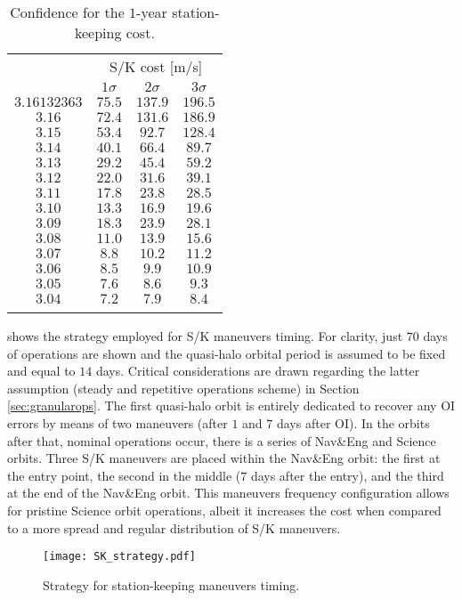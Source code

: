%
\begin{table}[]
	\caption{Confidence for the $1$-year station-keeping cost.}
	\label{tab:SKconfidence}
	\centering
	\begin{tabular}{cccc}
		\TOPlines
		\multirow{2}{*}{$C_j$ [adim]} & \multicolumn{3}{c}{S/K cost [m/s]} \\
		& $1\sigma$ & $2\sigma$ & $3\sigma$ \\
		\MIDline
		$3.16132363$ & $75.5$ & $137.9$ & $196.5$ \\
		$3.16$ & $72.4$ & $131.6$ & $186.9$ \\
		$3.15$ & $53.4$ & $92.7$ & $128.4$ \\
		$3.14$ & $40.1$ & $66.4$ & $89.7$ \\
		$3.13$ & $29.2$ & $45.4$ & $59.2$ \\
		$3.12$ & $22.0$ & $31.6$ & $39.1$ \\
		$3.11$ & $17.8$ & $23.8$ & $28.5$ \\
		$3.10$ & $13.3$ & $16.9$ & $19.6$ \\
		$3.09$ & $18.3$ & $23.9$ & $28.1$ \\
		$3.08$ & $11.0$ & $13.9$ & $15.6$ \\
		$3.07$ & $8.8$ & $10.2$ & $11.2$ \\
		$3.06$ & $8.5$ & $9.9$ & $10.9$ \\
		$3.05$ & $7.6$ & $8.6$ & $9.3$ \\
		$3.04$ & $7.2$ & $7.9$ & $8.4$ \\
		\BOTTOMlines
	\end{tabular}
\end{table}
%
 shows the strategy employed for S/K maneuvers timing. For clarity, just $70$ days of operations are shown and the quasi-halo orbital period is assumed to be fixed and equal to $14$ days. Critical considerations are drawn regarding the latter assumption (\ie steady and repetitive operations scheme) in Section \ref{sec:granularops}. The first quasi-halo orbit is entirely dedicated to recover any {OI} errors by means of two maneuvers (after $1$ and $7$ days after OI). In the orbits after that, nominal operations occur, \ie there is a series of Nav\&Eng and Science orbits. Three S/K maneuvers are placed within the Nav\&Eng orbit: the first at the entry point, the second in the middle (\ie $7$ days after the entry), and the third at the end of the Nav\&Eng orbit. This maneuvers frequency configuration allows for pristine Science orbit operations, albeit it increases the cost when compared to a more spread and regular distribution of S/K maneuvers.
%
\begin{figure}[]
	\centering
	\texttt{[image: SK\_strategy.pdf]}
	\caption{Strategy for station-keeping maneuvers timing.}
	\label{fig:SK_strategy}
\end{figure}
%

